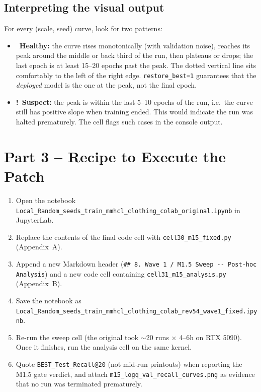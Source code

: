 \documentclass[11pt, a4paper]{article}
\newcommand{\cmark}{\textcolor{green!60!black}{\textbf{\checkmark}}}
\newcommand{\warnmark}{\textcolor{orange!80!black}{\textbf{!}}}
\begin{document}
\subsection*{Interpreting the visual output}
For every (scale, seed) curve, look for two patterns:

\begin{itemize}[leftmargin=*,itemsep=3pt]
  \item \cmark\ \textbf{Healthy:} the curve rises monotonically (with
        validation noise), reaches its peak around the middle or back third of
        the run, then plateaus or drops; the last epoch is at least 15--20
        epochs past the peak. The dotted vertical line sits comfortably to the
        left of the right edge. \texttt{restore\_best=1} guarantees that the
        \emph{deployed} model is the one at the peak, not the final epoch.
  \item \warnmark\ \textbf{Suspect:} the peak is within the last 5--10 epochs
        of the run, i.e.\ the curve still has positive slope when training
        ended. This would indicate the run was halted prematurely. The cell
        flags such cases in the console output.
\end{itemize}

\section{Part 3 -- Recipe to Execute the Patch}
\begin{enumerate}[leftmargin=*,itemsep=3pt]
  \item Open the notebook
        \texttt{Local\_Random\_seeds\_train\_mmhcl\_clothing\_colab\_original.ipynb}
        in JupyterLab.
  \item Replace the contents of the final code cell with
        \texttt{cell30\_m15\_fixed.py} (Appendix~A).
  \item Append a new Markdown header (\verb|## 8. Wave 1 / M1.5 Sweep -- Post-hoc Analysis|)
        and a new code cell containing \texttt{cell31\_m15\_analysis.py}
        (Appendix~B).
  \item Save the notebook as
        \texttt{Local\_Random\_seeds\_train\_mmhcl\_clothing\_colab\_rev54\_wave1\_fixed.ipynb}.
  \item Re-run the sweep cell (the original took $\sim$20 runs $\times$ 4--6h
        on RTX 5090). Once it finishes, run the analysis cell on the same
        kernel.
  \item Quote \texttt{BEST\_Test\_Recall@20} (not mid-run printouts) when
        reporting the M1.5 gate verdict, and attach
        \texttt{m15\_logq\_val\_recall\_curves.png} as evidence that no run
        was terminated prematurely.
\end{enumerate}
\end{document}
